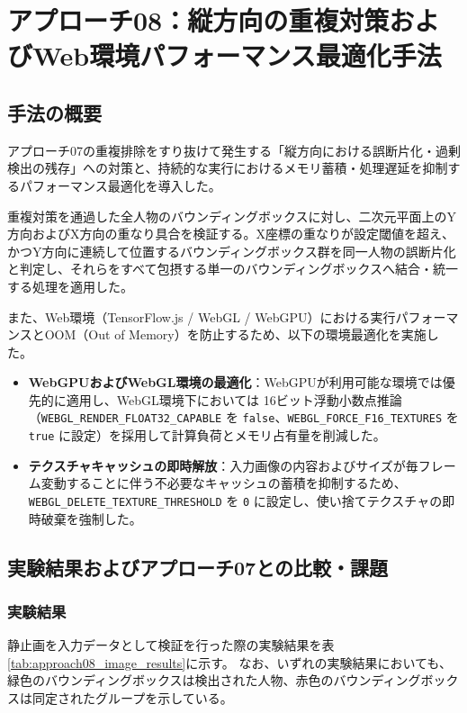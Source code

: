 \section{アプローチ08：縦方向の重複対策およびWeb環境パフォーマンス最適化手法}

\subsection{手法の概要}
アプローチ07の重複排除をすり抜けて発生する「縦方向における誤断片化・過剰検出の残存」への対策と、持続的な実行におけるメモリ蓄積・処理遅延を抑制するパフォーマンス最適化を導入した。

重複対策を通過した全人物のバウンディングボックスに対し、二次元平面上のY方向およびX方向の重なり具合を検証する。X座標の重なりが設定閾値を超え、かつY方向に連続して位置するバウンディングボックス群を同一人物の誤断片化と判定し、それらをすべて包摂する単一のバウンディングボックスへ結合・統一する処理を適用した。

また、Web環境（TensorFlow.js / WebGL / WebGPU）における実行パフォーマンスとOOM（Out of Memory）を防止するため、以下の環境最適化を実施した。

\begin{itemize}
    \item \textbf{WebGPUおよびWebGL環境の最適化}：WebGPUが利用可能な環境では優先的に適用し、WebGL環境下においては 16ビット浮動小数点推論（\texttt{WEBGL\_RENDER\_FLOAT32\_CAPABLE} を \texttt{false}、\texttt{WEBGL\_FORCE\_F16\_TEXTURES} を \texttt{true} に設定）を採用して計算負荷とメモリ占有量を削減した。
    \item \textbf{テクスチャキャッシュの即時解放}：入力画像の内容およびサイズが毎フレーム変動することに伴う不必要なキャッシュの蓄積を抑制するため、\texttt{WEBGL\_DELETE\_TEXTURE\_THRESHOLD} を \texttt{0} に設定し、使い捨てテクスチャの即時破棄を強制した。
\end{itemize}

\subsection{実験結果およびアプローチ07との比較・課題}

\subsubsection{実験結果}
静止画を入力データとして検証を行った際の実験結果を表\ref{tab:approach08_image_results}に示す。
なお、いずれの実験結果においても、緑色のバウンディングボックスは検出された人物、赤色のバウンディングボックスは同定されたグループを示している。


